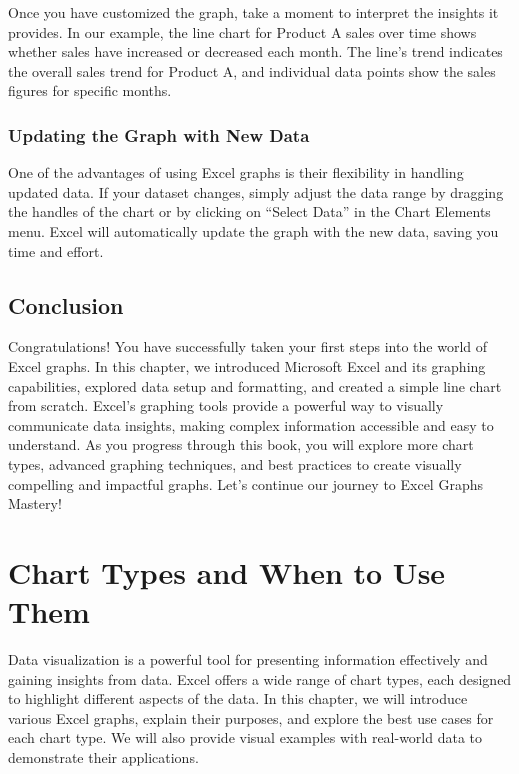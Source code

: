 \documentclass[
]{book}
\begin{document}
Once you have customized the graph, take a moment to interpret the insights it provides. In our example, the line chart for Product A sales over time shows whether sales have increased or decreased each month. The line's trend indicates the overall sales trend for Product A, and individual data points show the sales figures for specific months.

\hypertarget{updating-the-graph-with-new-data}{%
\subsection{Updating the Graph with New Data}\label{updating-the-graph-with-new-data}}

One of the advantages of using Excel graphs is their flexibility in handling updated data. If your dataset changes, simply adjust the data range by dragging the handles of the chart or by clicking on ``Select Data'' in the Chart Elements menu. Excel will automatically update the graph with the new data, saving you time and effort.

\hypertarget{conclusion}{%
\section{Conclusion}\label{conclusion}}

Congratulations! You have successfully taken your first steps into the world of Excel graphs. In this chapter, we introduced Microsoft Excel and its graphing capabilities, explored data setup and formatting, and created a simple line chart from scratch. Excel's graphing tools provide a powerful way to visually communicate data insights, making complex information accessible and easy to understand. As you progress through this book, you will explore more chart types, advanced graphing techniques, and best practices to create visually compelling and impactful graphs. Let's continue our journey to Excel Graphs Mastery!

\hypertarget{chart-types-and-when-to-use-them}{%
\chapter{Chart Types and When to Use Them}\label{chart-types-and-when-to-use-them}}

Data visualization is a powerful tool for presenting information effectively and gaining insights from data. Excel offers a wide range of chart types, each designed to highlight different aspects of the data. In this chapter, we will introduce various Excel graphs, explain their purposes, and explore the best use cases for each chart type. We will also provide visual examples with real-world data to demonstrate their applications.
\end{document}
